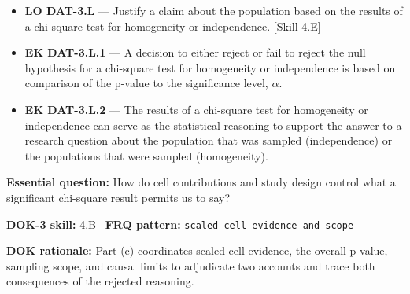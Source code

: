 \documentclass[11pt]{article}
\begin{document}
{\begin{itemize}[leftmargin=1.5em,itemsep=2pt,topsep=2pt]
  \item \textbf{LO DAT-3.L} --- Justify a claim about the population based on the results of a chi-square test for homogeneity or independence. [Skill 4.E]
  \item \textbf{EK DAT-3.L.1} --- A decision to either reject or fail to reject the null hypothesis for a chi-square test for homogeneity or independence is based on comparison of the p-value to the significance level, $\alpha$.
  \item \textbf{EK DAT-3.L.2} --- The results of a chi-square test for homogeneity or independence can serve as the statistical reasoning to support the answer to a research question about the population that was sampled (independence) or the populations that were sampled (homogeneity).
\end{itemize}
}
\textbf{Essential question:} How do cell contributions and study design control what a significant chi-square result permits us to say?\par
\textbf{DOK-3 skill:} 4.B \textperiodcentered\ \textbf{FRQ pattern:} {\small\texttt{scaled-\allowbreak{}cell-\allowbreak{}evidence-\allowbreak{}and-\allowbreak{}scope}}\par
\textbf{DOK rationale:} Part (c) coordinates scaled cell evidence, the overall p-value, sampling scope, and causal limits to adjudicate two accounts and trace both consequences of the rejected reasoning.\par

\end{document}
